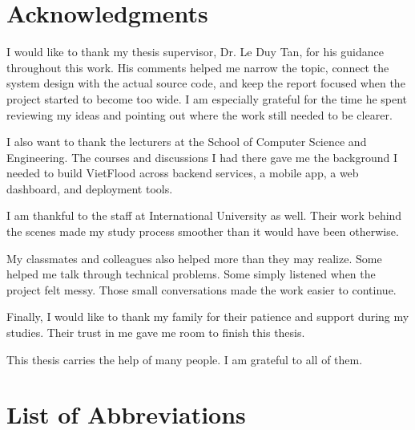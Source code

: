 \documentclass[12pt, twoside]{report}
\begin{document}
\chapter*{Acknowledgments}

I would like to thank my thesis supervisor, Dr. Le Duy Tan, for his guidance throughout this work. His comments helped me narrow the topic, connect the system design with the actual source code, and keep the report focused when the project started to become too wide. I am especially grateful for the time he spent reviewing my ideas and pointing out where the work still needed to be clearer.

I also want to thank the lecturers at the School of Computer Science and Engineering. The courses and discussions I had there gave me the background I needed to build VietFlood across backend services, a mobile app, a web dashboard, and deployment tools.

I am thankful to the staff at International University as well. Their work behind the scenes made my study process smoother than it would have been otherwise.

My classmates and colleagues also helped more than they may realize. Some helped me talk through technical problems. Some simply listened when the project felt messy. Those small conversations made the work easier to continue.

Finally, I would like to thank my family for their patience and support during my studies. Their trust in me gave me room to finish this thesis.

This thesis carries the help of many people. I am grateful to all of them.


\thispagestyle{empty}

\tableofcontents
\listoftables
{}
\listoffigures
{}

\newpage 
\chapter*{List of Abbreviations} 
\end{document}
